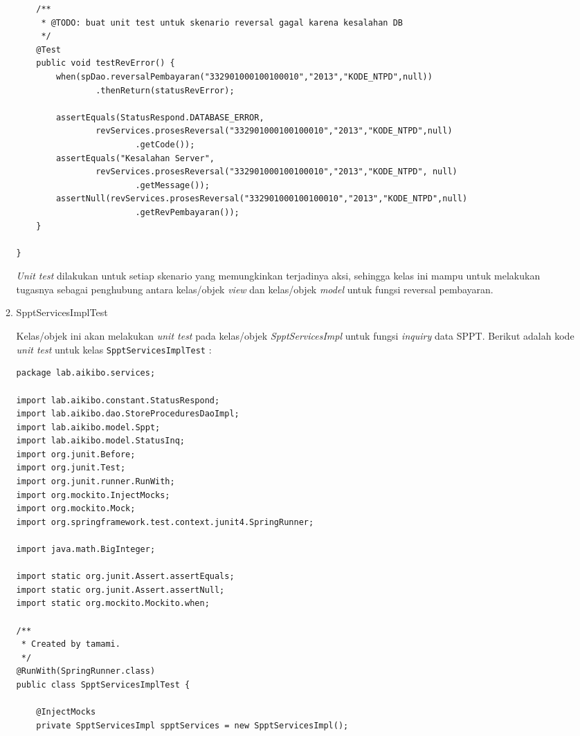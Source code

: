 \documentclass[pdftex,12pt, oneside]{article}
\begin{document}
\begin{enumerate}[A.]
\begin{enumerate}[1.]
\begin{lstlisting}
    /**
     * @TODO: buat unit test untuk skenario reversal gagal karena kesalahan DB
     */
    @Test
    public void testRevError() {
        when(spDao.reversalPembayaran("332901000100100010","2013","KODE_NTPD",null))
                .thenReturn(statusRevError);

        assertEquals(StatusRespond.DATABASE_ERROR,
                revServices.prosesReversal("332901000100100010","2013","KODE_NTPD",null)
                        .getCode());
        assertEquals("Kesalahan Server",
                revServices.prosesReversal("332901000100100010","2013","KODE_NTPD", null)
                        .getMessage());
        assertNull(revServices.prosesReversal("332901000100100010","2013","KODE_NTPD",null)
                        .getRevPembayaran());
    }

}   
    \end{lstlisting}
    
    \textit{Unit test} dilakukan untuk setiap skenario yang memungkinkan terjadinya aksi, sehingga kelas ini mampu untuk melakukan tugasnya sebagai penghubung antara kelas/objek \textit{view} dan kelas/objek \textit{model} untuk fungsi reversal pembayaran.
    
    \item SpptServicesImplTest
    
    Kelas/objek ini akan melakukan \textit{unit test} pada kelas/objek \textit{SpptServicesImpl} untuk fungsi \textit{inquiry} data SPPT. Berikut adalah kode \textit{unit test} untuk kelas \texttt{SpptServicesImplTest} :
    
    \begin{lstlisting}
package lab.aikibo.services;

import lab.aikibo.constant.StatusRespond;
import lab.aikibo.dao.StoreProceduresDaoImpl;
import lab.aikibo.model.Sppt;
import lab.aikibo.model.StatusInq;
import org.junit.Before;
import org.junit.Test;
import org.junit.runner.RunWith;
import org.mockito.InjectMocks;
import org.mockito.Mock;
import org.springframework.test.context.junit4.SpringRunner;

import java.math.BigInteger;

import static org.junit.Assert.assertEquals;
import static org.junit.Assert.assertNull;
import static org.mockito.Mockito.when;

/**
 * Created by tamami.
 */
@RunWith(SpringRunner.class)
public class SpptServicesImplTest {

    @InjectMocks
    private SpptServicesImpl spptServices = new SpptServicesImpl();


\end{lstlisting}
\end{enumerate}
\end{enumerate}
\end{document}
